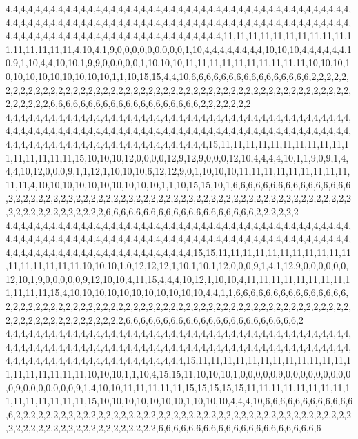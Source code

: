 4,4,4,4,4,4,4,4,4,4,4,4,4,4,4,4,4,4,4,4,4,4,4,4,4,4,4,4,4,4,4,4,4,4,4,4,4,4,4,4,4,4,4,4,4,4,4,4,4,4,4,4,4,4,4,4,4,4,4,4,4,4,4,4,4,4,4,4,4,4,4,4,4,4,4,4,4,4,4,4,4,4,4,4,4,4,4,4,4,4,4,4,4,4,4,4,4,4,4,4,4,4,4,4,4,4,4,4,4,4,4,4,4,4,4,4,4,4,4,4,4,11,11,11,11,11,11,11,11,11,11,11,11,11,11,11,11,4,10,4,1,9,0,0,0,0,0,0,0,0,0,1,10,4,4,4,4,4,4,4,4,10,10,10,4,4,4,4,4,4,10,9,1,10,4,4,10,10,1,9,9,0,0,0,0,0,1,10,10,10,11,11,11,11,11,11,11,11,11,11,10,10,10,10,10,10,10,10,10,10,10,10,1,1,10,15,15,4,4,10,6,6,6,6,6,6,6,6,6,6,6,6,6,6,6,6,2,2,2,2,2,2,2,2,2,2,2,2,2,2,2,2,2,2,2,2,2,2,2,2,2,2,2,2,2,2,2,2,2,2,2,2,2,2,2,2,2,2,2,2,2,2,2,2,2,2,2,2,2,2,2,2,2,6,6,6,6,6,6,6,6,6,6,6,6,6,6,6,6,6,6,6,6,2,2,2,2,2,2,2
4,4,4,4,4,4,4,4,4,4,4,4,4,4,4,4,4,4,4,4,4,4,4,4,4,4,4,4,4,4,4,4,4,4,4,4,4,4,4,4,4,4,4,4,4,4,4,4,4,4,4,4,4,4,4,4,4,4,4,4,4,4,4,4,4,4,4,4,4,4,4,4,4,4,4,4,4,4,4,4,4,4,4,4,4,4,4,4,4,4,4,4,4,4,4,4,4,4,4,4,4,4,4,4,4,4,4,4,4,4,4,4,4,4,4,4,4,4,4,15,11,11,11,11,11,11,11,11,11,11,11,11,11,11,11,11,15,10,10,10,12,0,0,0,0,12,9,12,9,0,0,0,12,10,4,4,4,4,10,1,1,9,0,9,1,4,4,4,10,12,0,0,0,9,1,1,12,1,10,10,10,6,12,12,9,0,1,10,10,10,11,11,11,11,11,11,11,11,11,11,11,4,10,10,10,10,10,10,10,10,10,10,1,1,10,15,15,10,1,6,6,6,6,6,6,6,6,6,6,6,6,6,6,6,6,2,2,2,2,2,2,2,2,2,2,2,2,2,2,2,2,2,2,2,2,2,2,2,2,2,2,2,2,2,2,2,2,2,2,2,2,2,2,2,2,2,2,2,2,2,2,2,2,2,2,2,2,2,2,2,2,2,2,2,6,6,6,6,6,6,6,6,6,6,6,6,6,6,6,6,6,6,6,6,2,2,2,2,2,2
4,4,4,4,4,4,4,4,4,4,4,4,4,4,4,4,4,4,4,4,4,4,4,4,4,4,4,4,4,4,4,4,4,4,4,4,4,4,4,4,4,4,4,4,4,4,4,4,4,4,4,4,4,4,4,4,4,4,4,4,4,4,4,4,4,4,4,4,4,4,4,4,4,4,4,4,4,4,4,4,4,4,4,4,4,4,4,4,4,4,4,4,4,4,4,4,4,4,4,4,4,4,4,4,4,4,4,4,4,4,4,4,4,4,4,4,4,15,15,11,11,11,11,11,11,11,11,11,11,11,11,11,11,11,11,11,10,10,10,1,0,12,12,12,1,10,1,10,1,12,0,0,0,9,1,4,1,12,9,0,0,0,0,0,0,12,10,1,9,0,0,0,0,0,9,12,10,10,4,11,15,4,4,4,10,12,1,10,10,4,11,11,11,11,11,11,11,11,11,11,11,11,15,4,10,10,10,10,10,10,10,10,10,10,10,4,4,1,1,6,6,6,6,6,6,6,6,6,6,6,6,6,6,6,2,2,2,2,2,2,2,2,2,2,2,2,2,2,2,2,2,2,2,2,2,2,2,2,2,2,2,2,2,2,2,2,2,2,2,2,2,2,2,2,2,2,2,2,2,2,2,2,2,2,2,2,2,2,2,2,2,2,2,2,2,2,6,6,6,6,6,6,6,6,6,6,6,6,6,6,6,6,6,6,6,6,6,6,6,2
4,4,4,4,4,4,4,4,4,4,4,4,4,4,4,4,4,4,4,4,4,4,4,4,4,4,4,4,4,4,4,4,4,4,4,4,4,4,4,4,4,4,4,4,4,4,4,4,4,4,4,4,4,4,4,4,4,4,4,4,4,4,4,4,4,4,4,4,4,4,4,4,4,4,4,4,4,4,4,4,4,4,4,4,4,4,4,4,4,4,4,4,4,4,4,4,4,4,4,4,4,4,4,4,4,4,4,4,4,4,4,4,4,4,4,4,15,11,11,11,11,11,11,11,11,11,11,11,11,11,11,11,11,11,11,11,10,10,10,1,1,10,4,15,15,11,10,10,10,1,0,0,0,0,0,9,0,0,0,0,0,0,0,0,0,0,9,0,0,0,0,0,0,0,9,1,4,10,10,11,11,11,11,11,15,15,15,15,15,11,11,11,11,11,11,11,11,11,11,11,11,11,11,11,15,10,10,10,10,10,10,10,1,10,10,10,4,4,4,10,6,6,6,6,6,6,6,6,6,6,6,6,6,2,2,2,2,2,2,2,2,2,2,2,2,2,2,2,2,2,2,2,2,2,2,2,2,2,2,2,2,2,2,2,2,2,2,2,2,2,2,2,2,2,2,2,2,2,2,2,2,2,2,2,2,2,2,2,2,2,2,2,2,2,2,2,2,2,6,6,6,6,6,6,6,6,6,6,6,6,6,6,6,6,6,6,6,6,6,6
